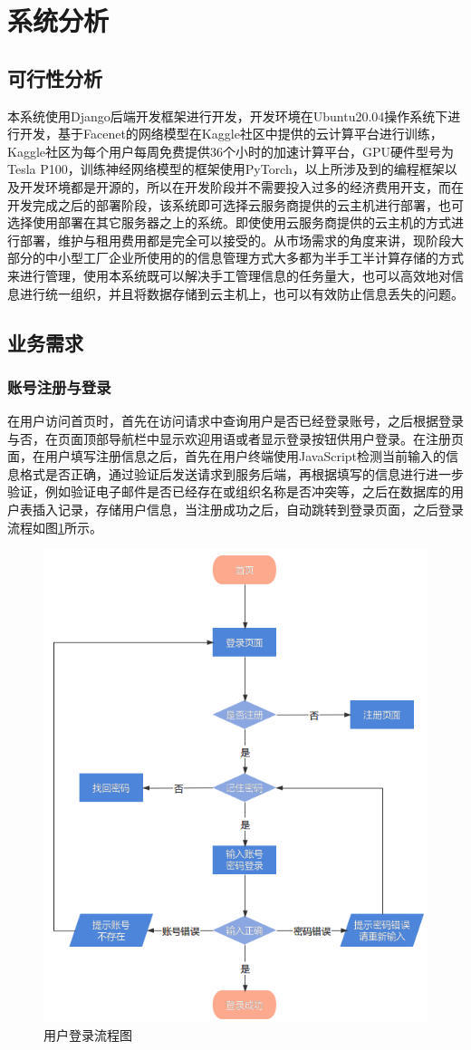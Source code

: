 \section{系统分析}

\subsection{可行性分析}

本系统使用Django后端开发框架进行开发，开发环境在Ubuntu20.04操作系统下进行开发，基于Facenet的网络模型在Kaggle社区中提供的云计算平台进行训练，Kaggle社区为每个用户每周免费提供36个小时的加速计算平台，GPU硬件型号为Tesla P100，训练神经网络模型的框架使用PyTorch，以上所涉及到的编程框架以及开发环境都是开源的，所以在开发阶段并不需要投入过多的经济费用开支，而在开发完成之后的部署阶段，该系统即可选择云服务商提供的云主机进行部署，也可选择使用部署在其它服务器之上的系统。即使使用云服务商提供的云主机的方式进行部署，维护与租用费用都是完全可以接受的。从市场需求的角度来讲，现阶段大部分的中小型工厂企业所使用的的信息管理方式大多都为半手工半计算存储的方式来进行管理，使用本系统既可以解决手工管理信息的任务量大，也可以高效地对信息进行统一组织，并且将数据存储到云主机上，也可以有效防止信息丢失的问题。

\subsection{业务需求}

\subsubsection{账号注册与登录}

在用户访问首页时，首先在访问请求中查询用户是否已经登录账号，之后根据登录与否，在页面顶部导航栏中显示欢迎用语或者显示登录按钮供用户登录。在注册页面，在用户填写注册信息之后，首先在用户终端使用JavaScript检测当前输入的信息格式是否正确，通过验证后发送请求到服务后端，再根据填写的信息进行进一步验证，例如验证电子邮件是否已经存在或组织名称是否冲突等，之后在数据库的用户表插入记录，存储用户信息，当注册成功之后，自动跳转到登录页面，之后登录流程如图\ref{fig:login}所示。

\begin{figure}[H]
    \centering
    \includegraphics[width=.35\textwidth]{figures/3loginprocess.png}
    \caption{用户登录流程图}
    \label{fig:login}
\end{figure}

